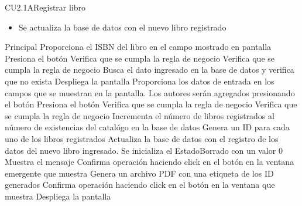 \begin{UseCase}{CU2.1A}{Registrar libro}
{			\begin{itemize}
				\item Se actualiza la base de datos con el nuevo libro registrado
			\end{itemize}			
		}
\end{UseCase}


\begin{UCtrayectoria}{Principal}
		\UCpaso[\UCactor] Proporciona el ISBN del libro en el campo mostrado en pantalla 
		\UCpaso[\UCactor] Presiona el botón  
		\UCpaso[\UCsist] Verifica que se cumpla la regla de negocio  
		\UCpaso[\UCsist] Verifica que se cumpla la regla de negocio  
		\UCpaso[\UCsist] Busca el dato ingresado en la base de datos  y verifica que no exista 
		\UCpaso[\UCsist] Despliega la pantalla 
		\UCpaso[\UCactor] Proporciona los datos de entrada en los campos que se muestran en la pantalla. Los autores serán agregados presionando el botón 
		\UCpaso[\UCactor] Presiona el botón  
		\UCpaso[\UCsist] Verifica que se cumpla la regla de negocio  
		\UCpaso[\UCsist] Verifica que se cumpla la regla de negocio  
		\UCpaso[\UCsist] Incrementa el número de libros registrados al número de existencias del catalógo en la base de datos
		\UCpaso[\UCsist] Genera un ID para cada uno de los libros registrados
		\UCpaso[\UCsist] Actualiza la base de datos con el registro de los datos del nuevo libro ingresado. Se inicializa el EstadoBorrado con un valor 0 
		\UCpaso[\UCsist] Muestra el mensaje 
		\UCpaso[\UCactor] Confirma operación haciendo click en el botón  en la ventana emergente que muestra						
		\UCpaso[\UCsist] Genera un archivo PDF con una etiqueta de los ID generados
		\UCpaso[\UCactor] Confirma operación haciendo click en el botón  en la ventana que muestra
		\UCpaso[\UCsist] Despliega la pantalla 
\end{UCtrayectoria}


